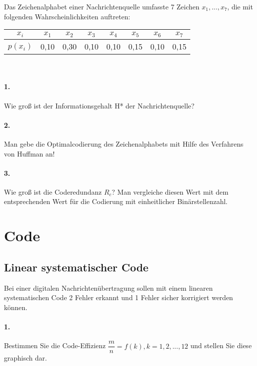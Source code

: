 \documentclass[paper=a4, fontsize=11pt]{scrartcl}
\numberwithin{equation}{section}
\numberwithin{figure}{section}
\numberwithin{table}{section}
\begin{document}
Das Zeichenalphabet einer Nachrichtenquelle umfasste 7 Zeichen $x_{1}, ..., x_{7}$, die mit folgenden Wahrscheinlichkeiten auftreten: 

\begin{center}
\begin{tabular}{|c||c|c|c|c|c|c|c|}
\hline
$x_{i}$ & $x_{1}$ & $x_{2}$ & $x_{3}$ & $x_{4}$ & $x_{5}$ & $x_{6}$ & $x_{7}$ \\
\hline
$p(x_{i})$ & 0,10 & 0,30 & 0,10 & 0,10 & 0,15 & 0,10 & 0,15 \\
\hline
\end{tabular}
\end{center}
\\

\paragraph{1.}
Wie groß ist der Informationsgehalt H* der Nachrichtenquelle? \\

\paragraph{2.}
Man gebe die Optimalcodierung des Zeichenalphabets mit Hilfe des Verfahrens von Huffman an! \\

\paragraph{3.}
Wie groß ist die Coderedundanz $R_{c}$? Man vergleiche diesen Wert mit dem entsprechenden Wert für die Codierung mit einheitlicher Binärstellenzahl.

\section{Code}
\subsection{Linear systematischer Code}
Bei einer digitalen Nachrichtenübertragung sollen mit einem linearen systematischen Code 2 Fehler erkannt und 1 Fehler sicher korrigiert werden können.

\paragraph{1.}
Bestimmen Sie die Code-Effizienz $\dfrac{m}{n} = f(k), k=1,2, ..., 12$ und stellen Sie diese graphisch dar. 
\end{document}
